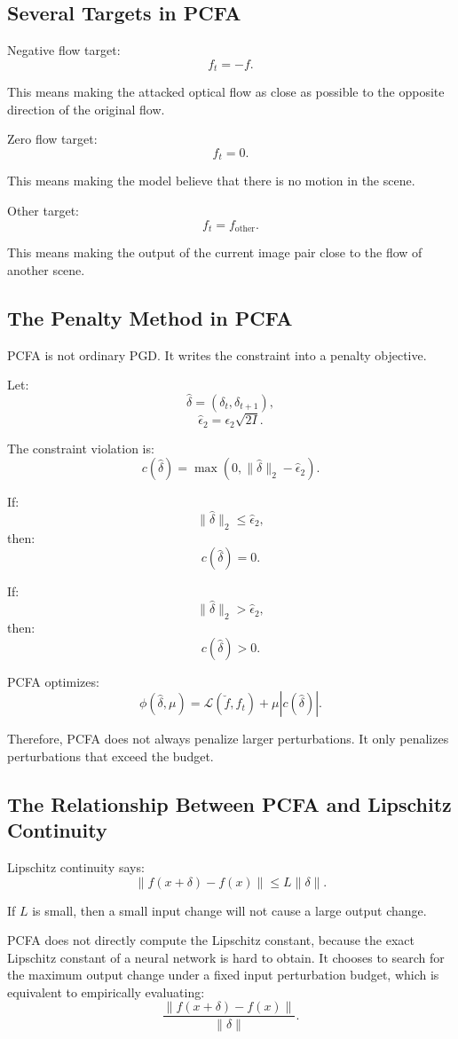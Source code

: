 \documentclass{article}
\begin{document}
\subsection{Several Targets in PCFA}

Negative flow target:
\[
f_t=-f.
\]

This means making the attacked optical flow as close as possible to the opposite direction of the original flow.

Zero flow target:
\[
f_t=0.
\]

This means making the model believe that there is no motion in the scene.

Other target:
\[
f_t=f_{\mathrm{other}}.
\]

This means making the output of the current image pair close to the flow of another scene.

\subsection{The Penalty Method in PCFA}

PCFA is not ordinary PGD. It writes the constraint into a penalty objective.

Let:
\[
\hat\delta=(\delta_t,\delta_{t+1}),
\]
\[
\hat\epsilon_2=\epsilon_2\sqrt{2I}.
\]

The constraint violation is:
\[
c(\hat\delta)
=
\max
\left(
0,
\|\hat\delta\|_2-\hat\epsilon_2
\right).
\]

If:
\[
\|\hat\delta\|_2\leq \hat\epsilon_2,
\]
then:
\[
c(\hat\delta)=0.
\]

If:
\[
\|\hat\delta\|_2>\hat\epsilon_2,
\]
then:
\[
c(\hat\delta)>0.
\]

PCFA optimizes:
\[
\phi(\hat\delta,\mu)
=
\mathcal{L}(\breve f,f_t)
+
\mu |c(\hat\delta)|.
\]

Therefore, PCFA does not always penalize larger perturbations. It only penalizes perturbations that exceed the budget.

\subsection{The Relationship Between PCFA and Lipschitz Continuity}

Lipschitz continuity says:
\[
\|f(x+\delta)-f(x)\|
\leq
L\|\delta\|.
\]

If \(L\) is small, then a small input change will not cause a large output change.

PCFA does not directly compute the Lipschitz constant, because the exact Lipschitz constant of a neural network is hard to obtain. It chooses to search for the maximum output change under a fixed input perturbation budget, which is equivalent to empirically evaluating:
\[
\frac{
\|f(x+\delta)-f(x)\|
}{
\|\delta\|
}.
\]
\end{document}
